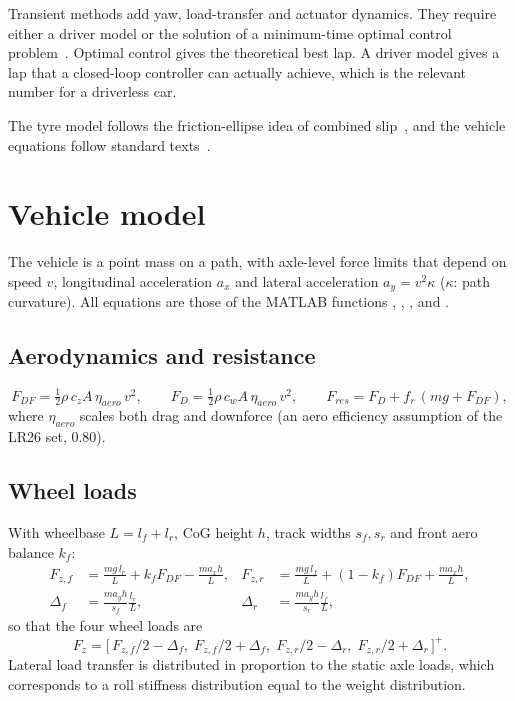 \documentclass[11pt]{article}
\begin{document}
Transient methods add yaw, load-transfer and actuator dynamics. They require either a driver model or the solution
of a minimum-time optimal control problem~\cite{casanova2000}. Optimal control gives the theoretical best lap. A
driver model gives a lap that a closed-loop controller can actually achieve, which is the relevant number for a
driverless car.

The tyre model follows the friction-ellipse idea of combined slip~\cite{pacejka2012}, and the vehicle equations
follow standard texts~\cite{milliken1995,rajamani2012}.

\section{Vehicle model}\label{sec:model}
The vehicle is a point mass on a path, with axle-level force limits that depend on speed $v$, longitudinal
acceleration $a_x$ and lateral acceleration $a_y = v^2\kappa$ ($\kappa$: path curvature). All equations are those
of the MATLAB functions , , ,
 and .

\subsection{Aerodynamics and resistance}
\begin{equation}
F_{DF} = \tfrac12\rho\,c_z A\,\eta_{aero}\,v^2,\qquad F_D = \tfrac12\rho\,c_w A\,\eta_{aero}\,v^2,\qquad
F_{res} = F_D + f_r\,(m g + F_{DF}),
\label{eq:res}
\end{equation}
where $\eta_{aero}$ scales both drag and downforce (an aero efficiency assumption of the LR26 set, 0.80).

\subsection{Wheel loads}
With wheelbase $L = l_f + l_r$, CoG height $h$, track widths $s_f, s_r$ and front aero balance $k_f$:
\begin{align}
F_{z,f} &= \frac{m g\,l_r}{L} + k_f F_{DF} - \frac{m a_x h}{L}, &
F_{z,r} &= \frac{m g\,l_f}{L} + (1-k_f) F_{DF} + \frac{m a_x h}{L}, \label{eq:fz}\\
\Delta_f &= \frac{m a_y h}{s_f}\frac{l_r}{L}, &
\Delta_r &= \frac{m a_y h}{s_r}\frac{l_f}{L},
\end{align}
so that the four wheel loads are
\begin{equation}
F_{z} = \big[\,F_{z,f}/2 - \Delta_f,\; F_{z,f}/2 + \Delta_f,\; F_{z,r}/2 - \Delta_r,\; F_{z,r}/2 + \Delta_r\,\big]^+ .
\end{equation}
Lateral load transfer is distributed in proportion to the static axle loads, which corresponds to a roll stiffness
distribution equal to the weight distribution.
\end{document}
